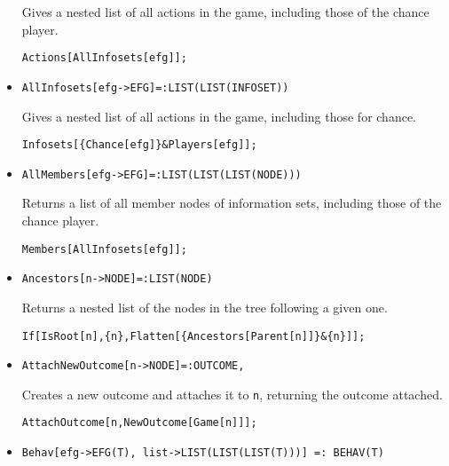 \begin{itemize}
\bd 
Gives a nested list of all actions in the game, including those of
the chance player.  
\begin{verbatim}
Actions[AllInfosets[efg]];
\end{verbatim} 
\ed

\item{}
\protect \large \begin{verbatim}
AllInfosets[efg->EFG]=:LIST(LIST(INFOSET))
\end{verbatim}\normalsize

\bd 
Gives a nested list of all actions in the game, including those for
chance. 
\begin{verbatim}
Infosets[{Chance[efg]}&Players[efg]];
\end{verbatim} 
\ed

\item{}
\protect \large \begin{verbatim}
AllMembers[efg->EFG]=:LIST(LIST(LIST(NODE)))
\end{verbatim}\normalsize

\bd 
Returns a list of all member nodes of information sets, including
those of the chance player.
\begin{verbatim}
Members[AllInfosets[efg]];
\end{verbatim} 
\ed

\item{}
\protect \large \begin{verbatim}
Ancestors[n->NODE]=:LIST(NODE)
\end{verbatim}\normalsize

\bd 
Returns a nested list of the nodes in the tree following a given one.  
\begin{verbatim}
If[IsRoot[n],{n},Flatten[{Ancestors[Parent[n]]}&{n}]];
\end{verbatim} 
\ed


\item{}
\protect \large \begin{verbatim}
AttachNewOutcome[n->NODE]=:OUTCOME,
\end{verbatim}\normalsize

\bd 
Creates a new outcome and attaches it to \verb+n+, returning the
outcome attached.  
\begin{verbatim}
AttachOutcome[n,NewOutcome[Game[n]]];
\end{verbatim} 
\ed


\item{}
\protect \large \begin{verbatim}
Behav[efg->EFG(T), list->LIST(LIST(LIST(T)))] =: BEHAV(T)
\end{verbatim}\normalsize


\end{itemize}
